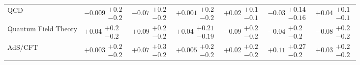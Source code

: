 \begin{table}[H]
\begin{tabular}{lllllll}
QCD & $-0.009\substack{+0.2 \\ -0.2}$ & $-0.07\substack{+0.2 \\ -0.2}$ & $+0.001\substack{+0.2 \\ -0.2}$ & $+0.02\substack{+0.1 \\ -0.1}$ & $-0.03\substack{+0.14 \\ -0.16}$ & $+0.04\substack{+0.1 \\ -0.1}$ \\
Quantum Field Theory & $+0.04\substack{+0.2 \\ -0.2}$ & $+0.09\substack{+0.2 \\ -0.2}$ & $+0.04\substack{+0.21 \\ -0.19}$ & $-0.09\substack{+0.2 \\ -0.2}$ & $-0.04\substack{+0.2 \\ -0.2}$ & $-0.08\substack{+0.2 \\ -0.2}$ \\
AdS/CFT & $+0.003\substack{+0.2 \\ -0.2}$ & $+0.07\substack{+0.3 \\ -0.2}$ & $+0.005\substack{+0.2 \\ -0.2}$ & $+0.02\substack{+0.2 \\ -0.2}$ & $+0.11\substack{+0.27 \\ -0.2}$ & $+0.03\substack{+0.2 \\ -0.2}$ \\
\bottomrule
\end{tabular}\normalsize\renewcommand{\arraystretch}{1}
\end{table}
